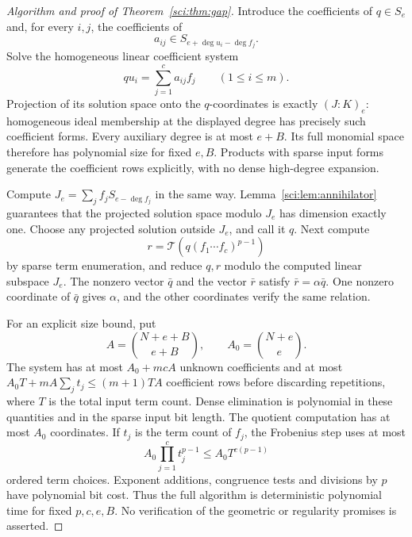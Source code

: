 \begin{proof}[Algorithm and proof of Theorem~\ref{sci:thm:gap}]
Introduce the coefficients of \(q\in S_e\) and, for every \(i,j\),
the coefficients of
\[
 a_{ij}\in S_{e+\deg u_i-\deg f_j}.
 \]
Solve the homogeneous linear coefficient system
\[
 q u_i=\sum_{j=1}^c a_{ij}f_j\qquad(1\leq i\leq m).
 \tag{\(\dagger\)}
\]
Projection of its solution space onto the \(q\)-coordinates is exactly
\((J:K)_e\): homogeneous ideal membership at the displayed degree
has precisely such coefficient forms. Every auxiliary degree is at
most \(e+B\). Its full monomial space therefore has polynomial size
for fixed \(e,B\). Products with sparse input forms generate the
coefficient rows explicitly, with no dense high-degree expansion.

Compute \(J_e=\sum_j f_jS_{e-\deg f_j}\) in the same way.
Lemma~\ref{sci:lem:annihilator} guarantees that the projected solution
space modulo \(J_e\) has dimension exactly one. Choose any projected
solution outside \(J_e\), and call it \(q\).
Next compute
\[
 r=\mathcal T\!\left(q(f_1\cdots f_c)^{p-1}\right)
 \]
by sparse term enumeration, and reduce \(q,r\) modulo the computed
linear subspace \(J_e\). The nonzero vector \(\bar q\) and the vector
\(\bar r\) satisfy \(\bar r=\alpha\bar q\).
One nonzero coordinate of \(\bar q\) gives \(\alpha\), and the other
coordinates verify the same relation.

For an explicit size bound, put
\[
 A=\binom{N+e+B}{e+B},\qquad
 A_0=\binom{N+e}{e}.
 \]
The system has at most \(A_0+mcA\) unknown coefficients and at most
\(A_0T+mA\sum_jt_j\leq(m+1)TA\) coefficient rows before discarding repetitions,
where \(T\) is the total input term count. Dense elimination is
polynomial in these quantities and in the sparse input bit length.
The quotient computation has at most \(A_0\) coordinates. If \(t_j\)
is the term count of \(f_j\), the Frobenius step uses at most
\[
 A_0\prod_{j=1}^c t_j^{p-1}\leq A_0T^{c(p-1)}
 \]
ordered term choices. Exponent additions, congruence tests and
divisions by \(p\) have polynomial bit cost. Thus the full algorithm
is deterministic polynomial time for fixed \(p,c,e,B\).
No verification of the geometric or regularity promises is asserted.
\end{proof}

